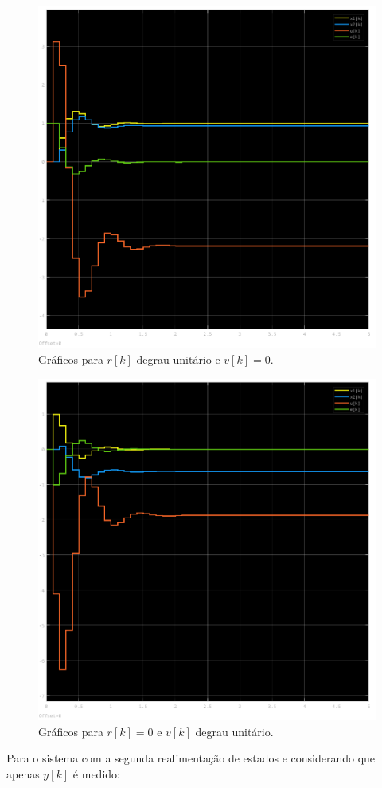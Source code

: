 \documentclass{article}
\begin{document}
    \begin{figure}[H]
        \centering
        \includegraphics[width=.6\linewidth]{images/q2_r1_v0.png}
        \caption{Gráficos para $r[k]$ degrau unitário e $v[k]=0$.}\label{fig:q2_r1_v0}
    \end{figure}

    \begin{figure}[H]
        \centering
        \includegraphics[width=.6\linewidth]{images/q2_r0_v1.png}
        \caption{Gráficos para $r[k]=0$ e $v[k]$ degrau unitário.}\label{fig:q2_r0_v1}
    \end{figure}


\clearpage
{Para o sistema com a segunda realimentação de estados e considerando que apenas
$y[k]$ é medido:}
\section{\normalsize {}}
\end{document}
